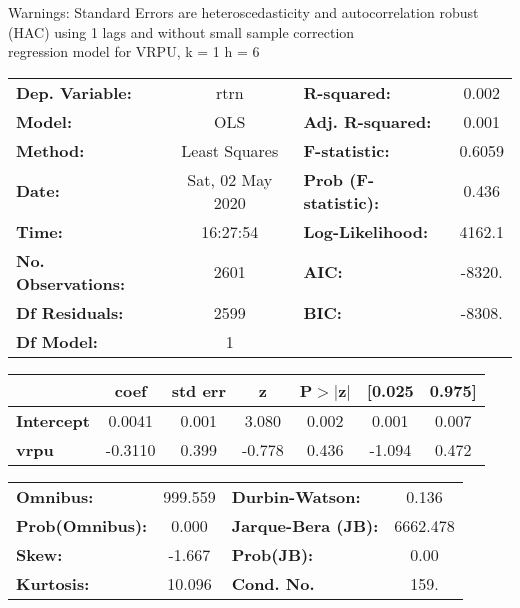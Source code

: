 Warnings: \newline
 [1] Standard Errors are heteroscedasticity and autocorrelation robust (HAC) using 1 lags and without small sample correction\\ 

regression model for VRPU, k = 1 h = 6\begin{center}
\begin{tabular}{lclc}
\toprule
\textbf{Dep. Variable:}    &       rtrn       & \textbf{  R-squared:         } &     0.002   \\
\textbf{Model:}            &       OLS        & \textbf{  Adj. R-squared:    } &     0.001   \\
\textbf{Method:}           &  Least Squares   & \textbf{  F-statistic:       } &    0.6059   \\
\textbf{Date:}             & Sat, 02 May 2020 & \textbf{  Prob (F-statistic):} &    0.436    \\
\textbf{Time:}             &     16:27:54     & \textbf{  Log-Likelihood:    } &    4162.1   \\
\textbf{No. Observations:} &        2601      & \textbf{  AIC:               } &    -8320.   \\
\textbf{Df Residuals:}     &        2599      & \textbf{  BIC:               } &    -8308.   \\
\textbf{Df Model:}         &           1      & \textbf{                     } &             \\
\bottomrule
\end{tabular}
\begin{tabular}{lcccccc}
                   & \textbf{coef} & \textbf{std err} & \textbf{z} & \textbf{P$> |$z$|$} & \textbf{[0.025} & \textbf{0.975]}  \\
\midrule
\textbf{Intercept} &       0.0041  &        0.001     &     3.080  &         0.002        &        0.001    &        0.007     \\
\textbf{vrpu}      &      -0.3110  &        0.399     &    -0.778  &         0.436        &       -1.094    &        0.472     \\
\bottomrule
\end{tabular}
\begin{tabular}{lclc}
\textbf{Omnibus:}       & 999.559 & \textbf{  Durbin-Watson:     } &    0.136  \\
\textbf{Prob(Omnibus):} &   0.000 & \textbf{  Jarque-Bera (JB):  } & 6662.478  \\
\textbf{Skew:}          &  -1.667 & \textbf{  Prob(JB):          } &     0.00  \\
\textbf{Kurtosis:}      &  10.096 & \textbf{  Cond. No.          } &     159.  \\
\bottomrule
\end{tabular}
\end{center}


